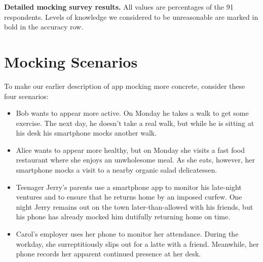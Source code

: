 
\begin{table*}[t]



\caption{\textbf{Detailed mocking survey results.} All values are percentages
of the 91 respondents. Levels of knowledge we considered to be unreasonable
are marked in bold in the accuracy row.}

\label{table-surveyresults}

\end{table*}

\section{Mocking Scenarios}
\label{sec-scenarios}

To make our earlier description of app mocking more concrete, consider these
four scenarios:

\begin{itemize}

\item Bob wants to appear more active. On Monday he takes a walk to get some
exercise. The next day, he doesn't take a real walk, but while he is sitting
at his desk his smartphone mocks another walk.

\item Alice wants to appear more healthy, but on Monday she visits a fast
food restaurant where she enjoys an unwholesome meal. As she eats, however, her
smartphone mocks a visit to a nearby organic salad delicatessen.

\item Teenager Jerry's parents use a smartphone app to monitor his late-night
  ventures and to ensure that he returns home by an imposed curfew. One
  night Jerry remains out on the town later-than-allowed with his friends,
  but his phone has already mocked him dutifully returning home on time.

\item Carol's employer uses her phone to monitor her attendance. During the
workday, she surreptitiously slips out for a latte with a friend.  Meanwhile,
her phone records her apparent continued presence at her desk.

\end{itemize}


